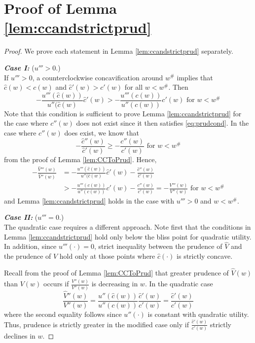 \documentclass[titlepage]{\econtex}
\begin{document}
  \section{Proof of Lemma \ref{lem:ccandstrictprud}} \label{app:ccandstrictprud}
  \begin{proof}
    We prove each statement in Lemma \ref{lem:ccandstrictprud} separately. 
    
    \bigskip
    \noindent \textbf{\textit{Case I:}} ($ u ''' > 0$.) \\
    If $u''' > 0$, a counterclockwise concavification around $w^{\#}$ implies that $\hat{c}(w) < c(w)$ and $\hat{c}'(w) > c'(w)$ for all $w < w^{\#}$. Then \[-\frac{u'''(\hat{c}(w))}{u''(\hat{c}(w)}\hat{c}'(w) > -\frac{u'''({c}(w))}{u''({c}(w))}{c}'(w) \text{ for } w < w^{\#} \]
    Note that this condition is sufficient to prove Lemma \ref{lem:ccandstrictprud} for the case where $c''(w)$ does not exist since it then satisfies \eqref{eq:prudcond}. In the case where $c''(w)$ does exist, we know that 
    \[-\frac{\hat{c}''(w)}{\hat{c}'(w)} \geq -\frac{{c}''(w)}{{c}'(w)} \text{ for } w < w^{\#}\]
    from the proof of Lemma \ref{lem:CCToPrud}. Hence,
    \begin{align*}- \frac{\hat{V}'''(w)}{\hat{V}''(w)} &= -\frac{u'''(\hat{c}(w))}{u''(\hat{c}(w)}\hat{c}'(w) - \frac{\hat{c}''(w)}{\hat{c}'(w)}
      \\
                                                       & > -\frac{u'''({c}(w))}{u''({c}(w))}{c}'(w) - \frac{{c}''(w)}{{c}'(w)} = - \frac{{V}'''(w)}{{V}''(w)} \text{ for } w < w^{\#}
    \end{align*}
    and Lemma \ref{lem:ccandstrictprud} holds in the case with $u''' > 0$ and $w < w^{\#}$.
    
    \bigskip
    \noindent \textbf{\textit{Case II:}} ($u''' = 0$.) \\
    The quadratic case requires a different approach. Note first that the conditions in Lemma \ref{lem:ccandstrictprud} hold only below the bliss point for quadratic utility. In addition, since $u'''(\cdot) = 0$, strict inequality between the prudence of $\hat{V}$ and the prudence of $V$ hold only at those points where $\hat{c}(\cdot)$ is strictly concave. 
    
    Recall from the proof of Lemma \ref{lem:CCToPrud} that greater prudence of $\hat{V}(w)$ than $V(w)$ occurs if  $\frac{\hat{V}''(w)}{V''(w)}$ is decreasing in $w$. In the quadratic case
    \begin{equation}
      \frac{\hat{V}''(w)}{V''(w)} = \frac{u''(\hat{c}(w))}{u''(c(w))} \frac{\hat{c}'(w)}{c'(w)} = \frac{\hat{c}'(w)}{c'(w)}
    \end{equation}
    where the second equality follows since $u''(\cdot)$ is constant with quadratic utility. Thus, prudence is strictly greater in the modified case only if $ \frac{\hat{c}'(w)}{c'(w)}$ strictly declines in $w$.
  \end{proof}
\end{document}
